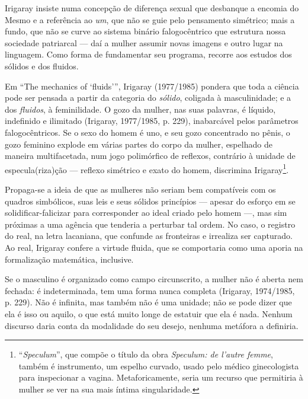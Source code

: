 Irigaray insiste numa concepção de diferença sexual que desbanque a
encomia do Mesmo e a referência ao \emph{um}, que não se guie pelo
pensamento simétrico; mais a fundo, que não se curve ao sistema binário
falogocêntrico que estrutura nossa sociedade patriarcal --- daí a mulher
assumir novas imagens e outro lugar na linguagem. Como forma de
fundamentar seu programa, recorre aos estudos dos sólidos e dos fluidos.

Em ``The mechanics of `fluids''', Irigaray (1977/1985) pondera que toda
a ciência pode ser pensada a partir da categoria do \emph{sólido},
coligada à masculinidade; e a dos \emph{fluidos}, à feminilidade. O gozo
da mulher, nas suas palavras, é líquido, indefinido e ilimitado
(Irigaray, 1977/1985, p. 229), inabarcável pelos parâmetros
falogocêntricos. Se o sexo do homem é uno, e seu gozo concentrado no
pênis, o gozo feminino explode em várias partes do corpo da mulher,
espelhado de maneira multifacetada, num jogo polimórfico de reflexos,
contrário à unidade de especula(riza)ção --- reflexo simétrico e exato
do homem, discrimina Irigaray\footnote{``\emph{Speculum}'', que compõe o
  título da obra \emph{Speculum: de l'autre femme}, também é
  instrumento, um espelho curvado, usado pelo médico ginecologista para
  inspecionar a vagina. Metaforicamente, seria um recurso que permitiria
  à mulher se ver na sua mais íntima singularidade.}.

Propaga-se a ideia de que as mulheres não seriam bem compatíveis com os
quadros simbólicos, suas leis e seus sólidos princípios --- apesar do
esforço em se solidificar-falicizar para corresponder ao ideal criado
pelo homem ---, mas sim próximas a uma agência que tenderia a perturbar
tal ordem. No caso, o registro do real, na letra lacaniana, que confunde
as fronteiras e irrealiza ser capturado. Ao real, Irigaray confere a
virtude fluida, que se comportaria como uma aporia na formalização
matemática, inclusive.

Se o masculino é organizado como campo circunscrito, a mulher não é
aberta nem fechada: é indeterminada, tem uma forma nunca completa
(Irigaray, 1974/1985, p. 229). Não é infinita, mas também não é uma
unidade; não se pode dizer que ela é isso ou aquilo, o que está muito
longe de estatuir que ela é nada. Nenhum discurso daria conta da
modalidade do seu desejo, nenhuma metáfora a definiria.

